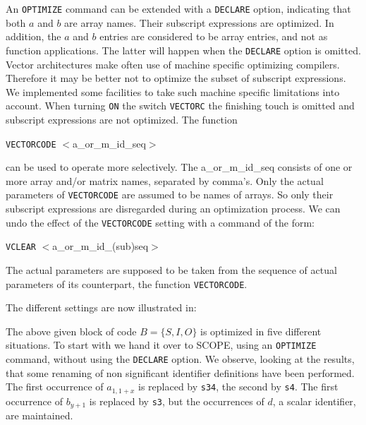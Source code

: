 An {\tt OPTIMIZE} command can be extended with a {\tt DECLARE} option,
indicating that both $a$ and $b$ are array names. Their subscript expressions
are optimized. In addition, the $a$ and $b$ entries are considered to be
array entries, and not as function applications. The latter will happen when
the {\tt DECLARE} option is omitted. Vector architectures make often use of
machine specific optimizing compilers. Therefore it may be better not to
optimize the subset of subscript expressions. We implemented some facilities
to take such machine specific limitations into account.  When turning {\tt ON}
the switch {\tt VECTORC} the finishing touch is omitted and subscript
expressions are not optimized. The function

\hspace*{1cm} {\tt VECTORCODE} $<$a\_or\_m\_id\_seq$>$

can be used to operate more selectively. The a\_or\_m\_id\_seq consists of
one or more array and/or matrix names, separated by comma's. Only the
actual parameters of {\tt VECTORCODE} are assumed to be  names of arrays. So
only their subscript expressions are disregarded during an optimization
process. We can undo the effect of the {\tt VECTORCODE} setting with a
command of the form:

\hspace*{1cm} {\tt VCLEAR} $<$a\_or\_m\_id\_(sub)seq$>$

The actual parameters are supposed to be taken from the sequence of actual
parameters of its counterpart, the function {\tt VECTORCODE}.

The different settings are now illustrated in:

\example\label{ex:7.1}

The above given block of code $B = \{ S, I, O \}$ is optimized in five
different situations. To start with we hand it over to SCOPE, using an
{\tt OPTIMIZE} command, without using the {\tt DECLARE} option.
We observe, looking at the results, that some renaming of non significant
identifier
definitions have been performed. The first occurrence of $a_{1,1+x}$ is replaced
by {\tt s34}, the second by  {\tt s4}. The first occurrence of $b_{y+1}$ is
replaced by {\tt s3}, but the occurrences of $d$, a scalar identifier,
are maintained.

